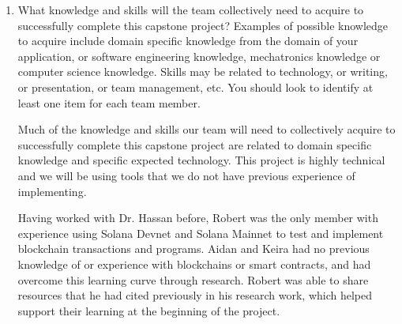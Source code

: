\documentclass[12pt]{article}
\begin{document}
\begin{enumerate}
\begin{itemize}
    \item \textbf{4C03 (Computer Networks and Security):}
    In this course, I learned about different network protocols, as well as encryption and information security. This knowledge is crucial in addressing some of the hazards we identified and meeting some functional and nonfunctional requirements related to data handling and network transactions.

    \item \textbf{4HC3 (Human Computer Interfaces):} 
    I am currently enrolled in this course and I believe the content related to usability requirement development and designing a user interface that meets the needs of the target user will be helpful, as a huge part of our capstone project is related to the web client through which requesters will interact with the system. Some major nonfunctional requirements which will verify if the project is a success with the target requester user group involve making the technical aspects of the system, such as the blockchain and Web3 wallet infrastructure, accessible and learnable to the average user with limited knowledge in these areas.
  \end{itemize}

  
  \item What knowledge and skills will the team collectively need to acquire to
  successfully complete this capstone project?  Examples of possible knowledge
  to acquire include domain specific knowledge from the domain of your
  application, or software engineering knowledge, mechatronics knowledge or
  computer science knowledge.  Skills may be related to technology, or writing,
  or presentation, or team management, etc.  You should look to identify at
  least one item for each team member.

  Much of the knowledge and skills our team will need to collectively acquire to successfully complete
  this capstone project are related to domain specific knowledge and specific expected technology. 
  This project is highly technical and we will be using tools that we do not have previous experience 
  of implementing. 

  Having worked with Dr. Hassan before, Robert was the only member with experience using Solana Devnet 
  and Solana Mainnet to test and implement blockchain transactions and programs. Aidan and Keira had 
  no previous knowledge of or experience with blockchains or smart contracts, and had overcome this 
  learning curve through research. Robert was able to share resources that he had cited 
  previously in his research work, which helped support their learning at the beginning of the project.


\end{enumerate}
\end{document}

